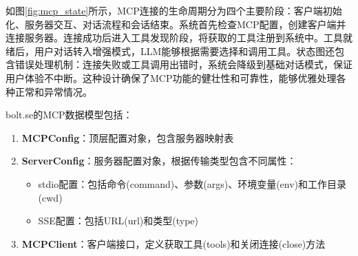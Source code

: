     
    
    
    
    
如图\ref{fig:mcp_state}所示，MCP连接的生命周期分为四个主要阶段：客户端初始化、服务器交互、对话流程和会话结束。系统首先检查MCP配置，创建客户端并连接服务器。连接成功后进入工具发现阶段，将获取的工具注册到系统中。工具就绪后，用户对话转入增强模式，LLM能够根据需要选择和调用工具。状态图还包含错误处理机制：连接失败或工具调用出错时，系统会降级到基础对话模式，保证用户体验不中断。这种设计确保了MCP功能的健壮性和可靠性，能够优雅处理各种正常和异常情况。

bolt.se的MCP数据模型包括：

\begin{enumerate}
  \item \textbf{MCPConfig}：顶层配置对象，包含服务器映射表
  
  \item \textbf{ServerConfig}：服务器配置对象，根据传输类型包含不同属性：
    \begin{itemize}
      \item stdio配置：包括命令(command)、参数(args)、环境变量(env)和工作目录(cwd)
      \item SSE配置：包括URL(url)和类型(type)
    \end{itemize}
  
  \item \textbf{MCPClient}：客户端接口，定义获取工具(tools)和关闭连接(close)方法
\end{enumerate}

